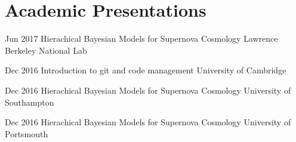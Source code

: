 \section{Academic Presentations}
\begin{entrylist}
\end{entrylist}
\begin{entrylist}
\end{entrylist}
\begin{entrylist}
\end{entrylist}
\begin{entrylist}
\end{entrylist}
\begin{entrylist}
\end{entrylist}
\begin{entrylist}
\end{entrylist}
\begin{entrylist}
\end{entrylist}
\begin{entrylist}
\end{entrylist}
\begin{entrylist}
	\entryInlineSmall
	{Jun 2017}
	{Hierachical Bayesian Models for Supernova Cosmology}
	{Lawrence Berkeley National Lab}
	{}
\end{entrylist}
\begin{entrylist}
	\entryInlineSmall
	{Dec 2016}
	{Introduction to git and code management}
	{University of Cambridge}
	{}
\end{entrylist}
\begin{entrylist}
	\entryInlineSmall
	{Dec 2016}
	{Hierachical Bayesian Models for Supernova Cosmology}
	{University of Southampton}
	{}
\end{entrylist}
\begin{entrylist}
	\entryInlineSmall
	{Dec 2016}
	{Hierachical Bayesian Models for Supernova Cosmology}
	{University of Portsmouth}
	{}
\end{entrylist}
